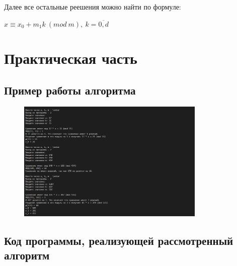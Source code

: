 \documentclass[bachelor, och, labwork]{shiza}
\begin{document}
Далее все остальные реешения можно найти по формуле:

\begin{center}
    $x \equiv x_0 + m_1k ~(mod ~m), ~k=\overline{0, d}$
\end{center}



\section{Практическая часть}
\subsection{Пример работы алгоритма}
\begin{figure}[H]
    \centering
    \includegraphics[width=0.8\textwidth]{pic1.png}
    \caption{}
\end{figure}

    \subsection{Код программы, реализующей рассмотренный алгоритм}
        \inputminted{python}{lab2.py}
\end{document}

